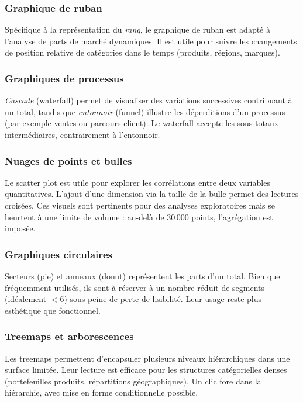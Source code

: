 \subsubsection{Graphique de ruban}
Spécifique à la représentation du \emph{rang}, le graphique de ruban est adapté à l'analyse de parts de marché dynamiques. Il est utile pour suivre les changements de position relative de catégories dans le temps (produits, régions, marques).

\subsubsection{Graphiques de processus}
\emph{Cascade} (waterfall) permet de visualiser des variations successives contribuant à un total, tandis que \emph{entonnoir} (funnel) illustre les déperditions d'un processus (par exemple ventes ou parcours client). Le waterfall accepte les sous-totaux intermédiaires, contrairement à l'entonnoir.

\subsubsection{Nuages de points et bulles}
Le scatter plot est utile pour explorer les corrélations entre deux variables quantitatives. L'ajout d'une dimension via la taille de la bulle permet des lectures croisées. Ces visuels sont pertinents pour des analyses exploratoires mais se heurtent à une limite de volume : au-delà de 30\,000 points, l’agrégation est imposée.

\subsubsection{Graphiques circulaires}
Secteurs (pie) et anneaux (donut) représentent les parts d'un total. Bien que fréquemment utilisés, ils sont à réserver à un nombre réduit de segments (idéalement $<6$) sous peine de perte de lisibilité. Leur usage reste plus esthétique que fonctionnel.

\subsubsection{Treemaps et arborescences}
Les treemaps permettent d'encapsuler plusieurs niveaux hiérarchiques dans une surface limitée. Leur lecture est efficace pour les structures catégorielles denses (portefeuilles produits, répartitions géographiques). Un clic fore dans la hiérarchie, avec mise en forme conditionnelle possible.

